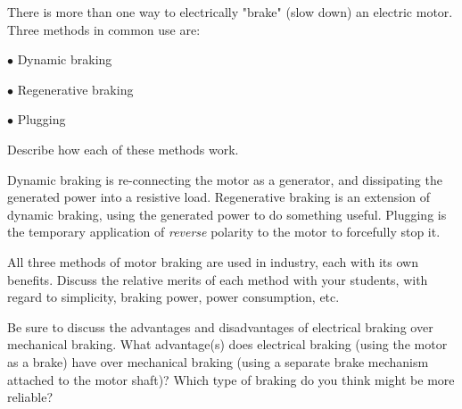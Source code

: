

There is more than one way to electrically "brake" (slow down) an electric motor.  Three methods in common use are:

\medskip
\item{$\bullet$} Dynamic braking
\item{$\bullet$} Regenerative braking
\item{$\bullet$} Plugging
\medskip

Describe how each of these methods work.







Dynamic braking is re-connecting the motor as a generator, and dissipating the generated power into a resistive load.  Regenerative braking is an extension of dynamic braking, using the generated power to do something useful.  Plugging is the temporary application of {\it reverse} polarity to the motor to forcefully stop it.







All three methods of motor braking are used in industry, each with its own benefits.  Discuss the relative merits of each method with your students, with regard to simplicity, braking power, power consumption, etc.  

Be sure to discuss the advantages and disadvantages of electrical braking over mechanical braking.  What advantage(s) does electrical braking (using the motor as a brake) have over mechanical braking (using a separate brake mechanism attached to the motor shaft)?  Which type of braking do you think might be more reliable?




